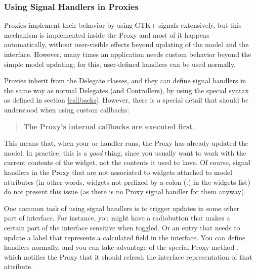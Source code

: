 \documentclass[a4paper]{howto}
\begin{document}
\subsubsection{Using Signal Handlers in Proxies}

Proxies implement their behavior by using GTK+ signals extensively, but
this mechanism is implemented inside the Proxy and most of it happens
automatically, without user-visible effects beyond updating of the model
and the interface. However, many times an application needs custom
behavior beyond the simple model updating; for this, user-defined
handlers can be used normally.

Proxies inherit from the Delegate classes, and they can define signal
handlers in the same way as normal Delegates (and Controllers), by using
the special syntax as defined in section \ref{callbacks}. However, there
is a special detail that should be understood when using custom
callbacks:

\begin{quotation}
{\bf The Proxy's internal callbacks are executed first}.
\end{quotation}

This means that, when your  or  handler
runs, the Proxy has already updated the model. In practice, this is a
{\it good} thing, since you usually want to work with the current
contents of the widget, not the contents it used to have. Of course,
signal handlers in the Proxy that are not associated to widgets attached
to model attributes (in other words, widgets not prefixed by a colon
(:) in the widgets list) do not present this issue (as there is no Proxy
signal handler for them anyway).

One common task of using signal handlers is to trigger updates in some
other part of interface. For instance, you might have a radiobutton that
makes a certain part of the interface sensitive when toggled. Or an
entry that needs to update a label that represents a calculated field in
the interface. You can define handlers normally, and you can take
advantage of the special Proxy method , which notifies the Proxy that it should refresh the
interface representation of that attribute.


\end{document}
